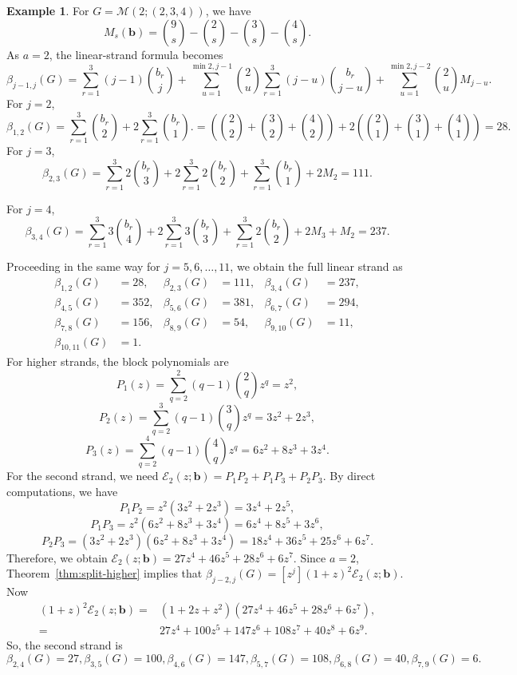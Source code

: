 \documentclass[12pt]{article}
\theoremstyle{definition}
\newtheorem{example}[theorem]{Example}
\theoremstyle{remark}
\newcommand{\EE}{\mathcal{E}}
\newcommand{\MM}{\mathcal{M}}
\newcommand{\bk}[1]{\mathbf{#1}}
\begin{document}
	
	\begin{example}\label{ex:split-example}
		For  $G=\MM(2;(2,3,4))$, we have  
		$$
		M_s(\bk{b})=\binom{9}{s}-\binom{2}{s}-\binom{3}{s}-\binom{4}{s}.
		$$
		As $a=2$, the linear-strand formula becomes
		$$
		\beta_{j-1,j}(G)
		= \sum_{r=1}^3 (j-1)\binom{b_r}{j}
		+
		\sum_{u=1}^{\min{2,j-1}}
		\binom{2}{u}\sum_{r=1}^3 (j-u)\binom{b_r}{j-u}
		+
		\sum_{u=1}^{\min{2,j-2}}
		\binom{2}{u}M_{j-u}.
		$$
		 For $j=2$,
		$$
		\beta_{1,2}(G)
		= \sum_{r=1}^3 \binom{b_r}{2}
		+
		2\sum_{r=1}^3 \binom{b_r}{1}.
		 = \left(\binom{2}{2}+\binom{3}{2}+\binom{4}{2}\right)
		+
		2\left(\binom{2}{1}+\binom{3}{1}+\binom{4}{1}\right)
		 =28.
		$$
		For $j=3$,
		$$
		\beta_{2,3}(G)
		= \sum_{r=1}^3 2\binom{b_r}{3}
		+
		2\sum_{r=1}^3 2\binom{b_r}{2}
		+
		\sum_{r=1}^3 \binom{b_r}{1}
		+
		2M_2=111.
		$$
		
		\medskip
		\noindent
		For $j=4$,
		$$
		\beta_{3,4}(G)
		= \sum_{r=1}^3 3\binom{b_r}{4}
		+
		2\sum_{r=1}^3 3\binom{b_r}{3}
		+
		\sum_{r=1}^3 2\binom{b_r}{2}
		+
		2M_3+M_2=237.
		$$
		
		\medskip
		\noindent
		Proceeding in the same way for $j=5,6,\dots,11$, we obtain the full linear strand as
		$$
		\begin{aligned}
			\beta_{1,2}(G)&=28, &
			\beta_{2,3}(G)&=111, &
			\beta_{3,4}(G)&=237, \\
			\beta_{4,5}(G)&=352, &
			\beta_{5,6}(G)&=381, &
			\beta_{6,7}(G)&=294, \\
			\beta_{7,8}(G)&=156, &
			\beta_{8,9}(G)&=54, &
			\beta_{9,10}(G)&=11, \\
			\beta_{10,11}(G)&=1. &&
		\end{aligned}
		$$
		For higher strands, the block polynomials are
		$$
		P_1(z)=\sum_{q=2}^{2}(q-1)\binom{2}{q}z^q=z^2,
		$$
		$$
		P_2(z)=\sum_{q=2}^{3}(q-1)\binom{3}{q}z^q=3z^2+2z^3,
		$$
		$$
		P_3(z)=\sum_{q=2}^{4}(q-1)\binom{4}{q}z^q=6z^2+8z^3+3z^4.
		$$
		 For the second strand,  we need
		$ \EE_2(z;\bk{b})=P_1P_2+P_1P_3+P_2P_3. $
		By direct computations, we have
		$$
		P_1P_2=z^2(3z^2+2z^3)=3z^4+2z^5,
		$$
		$$
		P_1P_3=z^2(6z^2+8z^3+3z^4)=6z^4+8z^5+3z^6,
		$$
		$$
		P_2P_3=(3z^2+2z^3)(6z^2+8z^3+3z^4)=18z^4+36z^5+25z^6+6z^7.
		$$
		Therefore, we obtain 
		$ \EE_2(z;\bk{b})=27z^4+46z^5+28z^6+6z^7. $
		Since $a=2$, Theorem~\ref{thm:split-higher} implies that 
		$ \beta_{j-2,j}(G)=[z^j](1+z)^2\EE_2(z;\bk{b}). $
		Now
		\begin{align*}
		 (1+z)^2\EE_2(z;\bk{b})
		=& (1+2z+z^2)(27z^4+46z^5+28z^6+6z^7),\\
		=& 27z^4+100z^5+147z^6+108z^7+40z^8+6z^9. 
		\end{align*}
		So, the second strand is
		$$
		\beta_{2,4}(G)=27,
		\beta_{3,5}(G)=100,
		\beta_{4,6}(G)=147, 
		\beta_{5,7}(G)=108,
		\beta_{6,8}(G)=40,
		\beta_{7,9}(G)=6.
		$$
		

\end{example}
\end{document}
